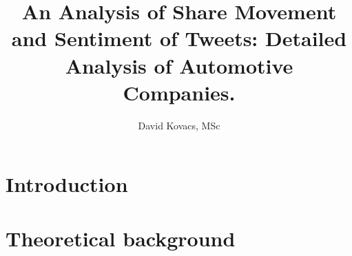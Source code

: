 \documentclass{includes/fhwn-masterthesis}
\title{An Analysis of Share Movement and Sentiment of Tweets: Detailed Analysis of Automotive Companies.}
\author{David Kovacs, MSc}
\begin{document}
\frontmatter







\normalsize


%

% 

        
\tableofcontents
\cleardoublepage

\printglossary[type=\acronymtype,title=List of Acronyms,style=long]
\cleardoublepage


\glsresetall
\mainmatter


\chapter{Introduction}
\label{c:introduction}


\chapter{Theoretical background}
\label{c:background}

\end{document}
